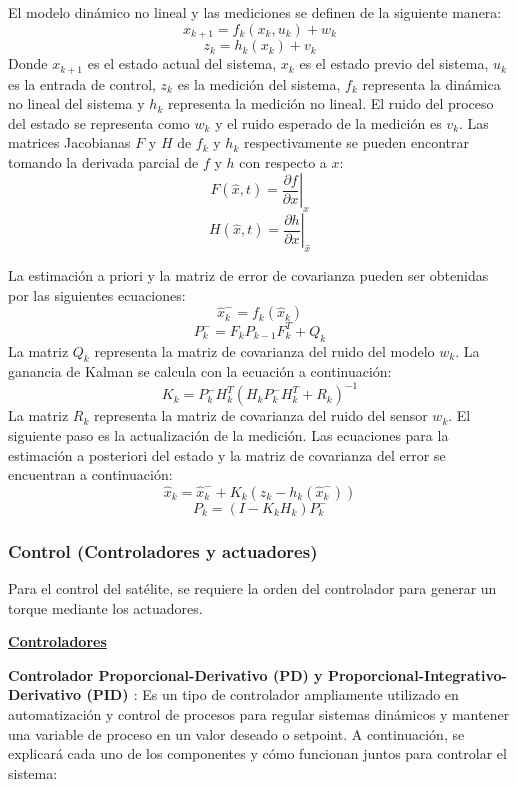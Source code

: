 El modelo dinámico no lineal y las mediciones se definen de la siguiente manera:
\[
x_{k+1} = f_k(x_k, u_k) + w_k
\]
\[
z_k = h_k(x_k) + v_k
\]
Donde $x_{k+1}$ es el estado actual del sistema, $x_k$ es el estado previo del sistema, $u_k$ es la entrada de control, $z_k$ es la medición del sistema, $f_k$ representa la dinámica no lineal del sistema y $h_k$ representa la medición no lineal. El ruido del proceso del estado se representa como $w_k$ y el ruido esperado de la medición es $v_k$. Las matrices Jacobianas $F$ y $H$ de $f_k$ y $h_k$ respectivamente se pueden encontrar tomando la derivada parcial de $f$ y $h$ con respecto a $x$:
\[
F(\hat{x}, t) = \left. \frac{\partial f}{\partial x} \right|_{\hat{x}} 
\]
\[
H(\hat{x}, t) = \left. \frac{\partial h}{\partial x} \right|_{\hat{x}} 
\]

La estimación a priori y la matriz de error de covarianza pueden ser obtenidas por las siguientes ecuaciones:
\[
\hat{x}_k^- = f_k(\hat{x}_k)
\]
\[
P_k^- = F_k P_{k-1} F_k^T + Q_k
\]
La matriz $Q_k$ representa la matriz de covarianza del ruido del modelo $w_k$. La ganancia de Kalman se calcula con la ecuación a continuación:
\[
K_k = P_k^- H_k^T \left( H_k P_k^- H_k^T + R_k \right)^{-1}
\]
La matriz $R_k$ representa la matriz de covarianza del ruido del sensor $w_k$. El siguiente paso es la actualización de la medición. Las ecuaciones para la estimación a posteriori del estado y la matriz de covarianza del error se encuentran a continuación:
\[
\hat{x}_k = \hat{x}_k^- + K_k \left( z_k - h_k(\hat{x}_k^-) \right)
\]
\[
P_k = \left( I - K_k H_k \right) P_k^-
\]

\subsubsection{Control (Controladores y actuadores)}

Para el control del satélite, se requiere la orden del controlador para generar un torque mediante los actuadores.

\textbf{\underline{Controladores}}

\textbf{Controlador Proporcional-Derivativo (PD) y Proporcional-Integrativo-Derivativo (PID) \cite{ref23}}: Es un tipo de controlador ampliamente utilizado en automatización y control de procesos para regular sistemas dinámicos y mantener una variable de proceso en un valor deseado o setpoint. A continuación, se explicará cada uno de los componentes y cómo funcionan juntos para controlar el sistema:


